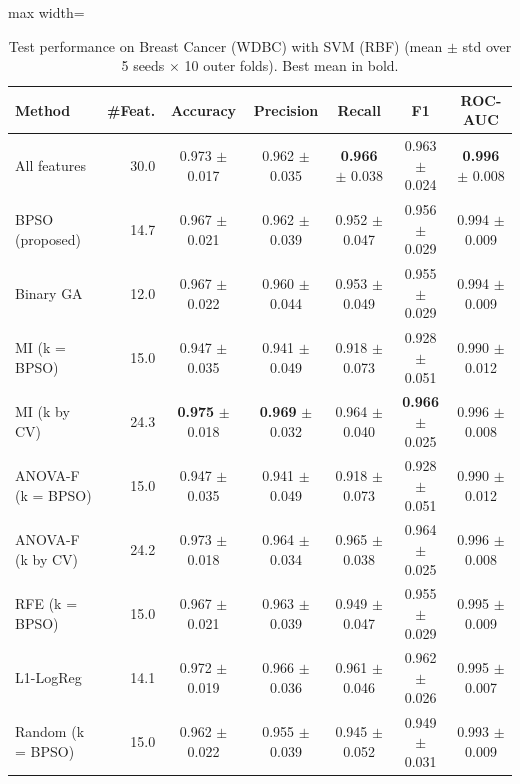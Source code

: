 \begin{table}[!t]
\centering
\caption{Test performance on Breast Cancer (WDBC) with SVM (RBF) (mean $\pm$ std over 5 seeds $\times$ 10 outer folds). Best mean in bold.}
\label{tab:results_breast_cancer}
\footnotesize
\setlength{\tabcolsep}{4pt}
\begin{adjustbox}{max width=\linewidth}
\begin{tabular}{lrccccc}
\toprule
\textbf{Method} & \textbf{\#Feat.} & \textbf{Accuracy} & \textbf{Precision} & \textbf{Recall} & \textbf{F1} & \textbf{ROC-AUC} \\
\midrule
All features & 30.0 & 0.973 $\pm$ 0.017 & 0.962 $\pm$ 0.035 & \textbf{0.966} $\pm$ 0.038 & 0.963 $\pm$ 0.024 & \textbf{0.996} $\pm$ 0.008 \\
BPSO (proposed) & 14.7 & 0.967 $\pm$ 0.021 & 0.962 $\pm$ 0.039 & 0.952 $\pm$ 0.047 & 0.956 $\pm$ 0.029 & 0.994 $\pm$ 0.009 \\
Binary GA & 12.0 & 0.967 $\pm$ 0.022 & 0.960 $\pm$ 0.044 & 0.953 $\pm$ 0.049 & 0.955 $\pm$ 0.029 & 0.994 $\pm$ 0.009 \\
MI (k = BPSO) & 15.0 & 0.947 $\pm$ 0.035 & 0.941 $\pm$ 0.049 & 0.918 $\pm$ 0.073 & 0.928 $\pm$ 0.051 & 0.990 $\pm$ 0.012 \\
MI (k by CV) & 24.3 & \textbf{0.975} $\pm$ 0.018 & \textbf{0.969} $\pm$ 0.032 & 0.964 $\pm$ 0.040 & \textbf{0.966} $\pm$ 0.025 & 0.996 $\pm$ 0.008 \\
ANOVA-F (k = BPSO) & 15.0 & 0.947 $\pm$ 0.035 & 0.941 $\pm$ 0.049 & 0.918 $\pm$ 0.073 & 0.928 $\pm$ 0.051 & 0.990 $\pm$ 0.012 \\
ANOVA-F (k by CV) & 24.2 & 0.973 $\pm$ 0.018 & 0.964 $\pm$ 0.034 & 0.965 $\pm$ 0.038 & 0.964 $\pm$ 0.025 & 0.996 $\pm$ 0.008 \\
RFE (k = BPSO) & 15.0 & 0.967 $\pm$ 0.021 & 0.963 $\pm$ 0.039 & 0.949 $\pm$ 0.047 & 0.955 $\pm$ 0.029 & 0.995 $\pm$ 0.009 \\
L1-LogReg & 14.1 & 0.972 $\pm$ 0.019 & 0.966 $\pm$ 0.036 & 0.961 $\pm$ 0.046 & 0.962 $\pm$ 0.026 & 0.995 $\pm$ 0.007 \\
Random (k = BPSO) & 15.0 & 0.962 $\pm$ 0.022 & 0.955 $\pm$ 0.039 & 0.945 $\pm$ 0.052 & 0.949 $\pm$ 0.031 & 0.993 $\pm$ 0.009 \\
\bottomrule
\end{tabular}
\end{adjustbox}
\end{table}
